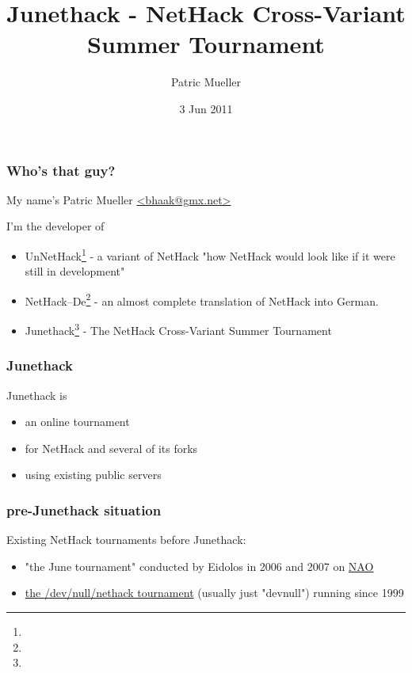 \documentclass[handout]{beamer}
\title{Junethack - NetHack Cross-Variant Summer Tournament}
\author{Patric Mueller}
\date{3 Jun 2011}
\begin{document}
\begin{frame}
\titlepage
\end{frame}


\begin{frame}
\frametitle{Who's that guy?}
My name's Patric Mueller \href{mailto:bhaak@gmx.net}{<bhaak@gmx.net>} \pause

I'm the developer of \pause

  \begin{itemize}[<+->]
    \item UnNetHack\footnote{} - a variant of NetHack "how NetHack would look like if it were still in development"
    \item NetHack--De\footnote{} - an almost complete translation of NetHack into German.
    \item Junethack\footnote{} - The NetHack Cross-Variant Summer Tournament
  \end{itemize}
\end{frame}

\begin{frame}
\frametitle{Junethack}
Junethack is
  \begin{itemize}
    \item an online tournament
    \item for NetHack and several of its forks
    \item using existing public servers
  \end{itemize}
\end{frame}

\begin{frame}
\frametitle{pre-Junethack situation}
  Existing NetHack tournaments before Junethack:\pause
  \begin{itemize}[<+->]
    \item "the June tournament" conducted by Eidolos in 2006 and 2007 on \href{http://nethack.alt.org/}{NAO}
    \item \href{http://nethack.devnull.net/}{the /dev/null/nethack tournament} (usually just "devnull") running since 1999
  \end{itemize}
\end{frame}
\end{document}
